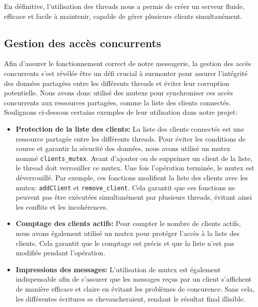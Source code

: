 \documentclass[utf8]{article}
\begin{document}
En définitive, l'utilisation des threads nous a permis de créer un serveur fluide, efficace et facile à maintenir, capable de gérer plusieurs clients simultanément.

\subsection{Gestion des accès concurrents}
Afin d'assurer le fonctionnement correct de notre messagerie, la gestion des accès concurrents s'est révélée être un défi crucial à surmonter pour assurer 
l'intégrité des données partagées entre les différents threads et éviter leur corruption potentielle. Nous avons donc utilisé des mutexs pour synchroniser ces accès 
concurrents aux ressources partagées, comme la liste des clients connectés. Soulignons ci-dessous certains exemples de leur utilisation dans notre projet:
\begin{itemize}
    \item \textbf{Protection de la liste des clients:} La liste des clients connectés est une ressource partagée entre les différents threads. 
    Pour éviter les conditions de course et garantir la sécurité des données, nous avons utilisé un mutex nommé \texttt{clients\_mutex}. Avant d'ajouter
    ou de supprimer un client de la liste, le thread doit verrouiller ce mutex. Une fois l'opération terminée, le mutex est déverrouillé.
    Par exemple, ces fonctions modifient la liste des clients avec les mutex: \texttt{addClient} et \texttt{remove\_client}.
    Cela garantit que ces fonctions ne peuvent pas être exécutées simultanément par plusieurs threads, évitant ainsi les conflits et les incohérences.
    \item \textbf{Comptage des clients actifs:} Pour compter le nombre de clients actifs, nous avons également utilisé un mutex pour protéger l'accès à la 
    liste des clients. Cela garantit que le comptage est précis et que la liste n'est pas modifiée pendant l'opération.
    \item \textbf{Impressions des messages:} L'utilisation de mutex est également indispensable afin de s'assurer que les messages reçus par un client s'affichent de manière efficace et claire en évitant 
    les problèmes de concurence. Sans cela, les différentes écritures se chevaucheraient, rendant le résultat final illisible.
\end{itemize}
\end{document}
